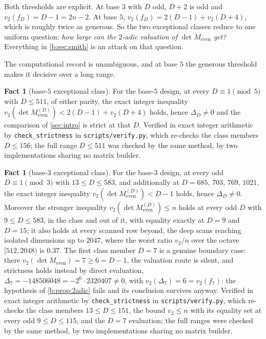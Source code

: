 \documentclass[11pt]{amsart}
\theoremstyle{definition}
\newtheorem{fact}[theorem]{Fact}
\theoremstyle{remark}
\begin{document}
Both thresholds are explicit. At base $3$ with $D$ odd, $D+2$ is odd and $v_2(f_D) = D - 1 = 2n - 2$. At base $5$, $v_2(f_D) = 2(D-1) + v_2(D+4)$, which is roughly twice as generous. So the two exceptional classes reduce to one uniform question: \emph{how large can the $2$-adic valuation of $\det M_{\mathrm{even}}$ get?} Everything in \cref{b:sec:smith} is an attack on that question.

The computational record is unambiguous, and at base $5$ the generous threshold makes it decisive over a long range.

\begin{fact}[base-$5$ exceptional class]
\label{b:fact:b5strict}
For the base-$5$ design, at every $D \equiv 1 \pmod 5$ with $D \le 511$, of either parity, the exact integer inequality $v_2(\det M_{\mathrm{even}}^{(D)}) < 2(D-1) + v_2(D+4)$ holds, hence $\Delta_D \ne 0$ and the comparison of \cref{sec:intro} is strict at that $D$. Verified in exact integer arithmetic by \texttt{check\_strictness} in \texttt{scripts/verify.py}, which re-checks the class members $D \le 156$; the full range $D \le 511$ was checked by the same method, by two implementations sharing no matrix builder.
\end{fact}

\begin{fact}[base-$3$ exceptional class]
\label{b:fact:b3strict}
For the base-$3$ design, at every odd $D \equiv 1 \pmod 3$ with $13 \le D \le 583$, and additionally at $D = 685,\,703,\,769,\,1021$, the exact integer inequality $v_2(\det M_{\mathrm{even}}^{(D)}) < D - 1$ holds, hence $\Delta_D \ne 0$. Moreover the stronger inequality $v_2(\det M_{\mathrm{even}}^{(D)}) \le n$ holds at every odd $D$ with $9 \le D \le 583$, in the class and out of it, with equality exactly at $D = 9$ and $D = 15$; it also holds at every scanned row beyond, the deep scans reaching isolated dimensions up to $2047$, where the worst ratio $v_2/n$ over the octave $[512, 2048)$ is $0.37$. The first class member $D = 7$ is a genuine boundary case: there $v_2(\det M_{\mathrm{even}}) = 7 \ge 6 = D-1$, the valuation route is silent, and strictness holds instead by direct evaluation, $\Delta_7 = -148506048 = -2^6 \cdot 2320407 \ne 0$, with $v_2(\Delta_7) = 6 = v_2(f_7)$: the hypothesis of \cref{b:prop:2adic} fails and its conclusion survives anyway. Verified in exact integer arithmetic by \texttt{check\_strictness} in \texttt{scripts/verify.py}, which re-checks the class members $13 \le D \le 151$, the bound $v_2 \le n$ with its equality set at every odd $9 \le D \le 115$, and the $D = 7$ evaluation; the full ranges were checked by the same method, by two implementations sharing no matrix builder.
\end{fact}
\end{document}
